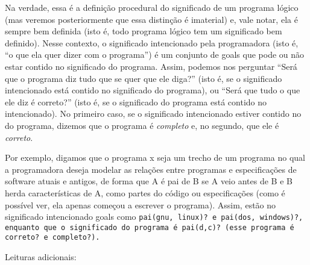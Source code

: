 \documentclass{article}
\theoremstyle{definition}
\theoremstyle{remark}
\begin{document}
  Na verdade, essa é a definição procedural do significado de um programa lógico (mas veremos posteriormente que essa distinção é imaterial) e, vale notar, ela é sempre bem definida (isto é, todo programa lógico tem um significado bem definido). Nesse contexto, o significado intencionado pela programadora (isto é, ``o que ela quer dizer com o programa'') é um conjunto de goals que pode ou não estar contido no significado do programa. Assim, podemos nos perguntar ``Será que o
  programa diz tudo que se quer que ele diga?'' (isto é, se o significado intencionado está contido no significado do programa), ou ``Será que tudo o que ele diz é correto?'' (isto é, se o significado do programa está contido no intencionado). No primeiro caso, se o significado intencionado estiver contido no do programa, dizemos que o programa é \textit{completo} e, no segundo, que ele é \textit{correto}.

  Por exemplo, digamos que o programa x seja um trecho de um programa no qual a programadora deseja modelar as relações entre programas e especificações de software atuais e antigos, de forma que A é pai de B se A veio antes de B e B herda características de A, como partes do código ou especificações (como é possível ver, ela apenas começou a escrever o programa). Assim, estão no significado intencionado goals como \tt{pai(gnu, linux)?} e \tt{pai(dos, windows)?}, enquanto que o
  significado do programa é {\tt{pai(d,c)?}} (esse programa é correto? e completo?).


  Leituras adicionais:
\end{document}
